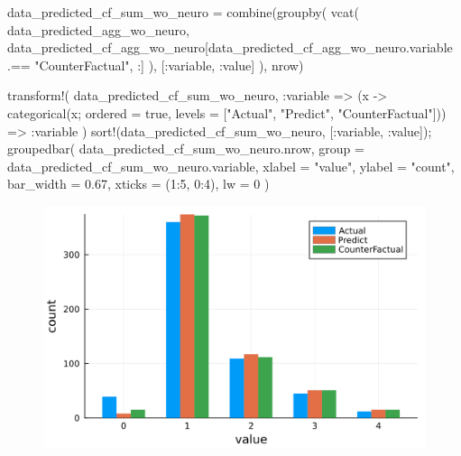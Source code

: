 \documentclass[
  letterpaper,
  DIV=11,
  numbers=noendperiod]{scrreprt}
\newenvironment{Shaded}{\begin{snugshade}}{\end{snugshade}}
\newcommand{\ConstantTok}[1]{\textcolor[rgb]{0.56,0.35,0.01}{#1}}
\newcommand{\FloatTok}[1]{\textcolor[rgb]{0.68,0.00,0.00}{#1}}
\newcommand{\FunctionTok}[1]{\textcolor[rgb]{0.28,0.35,0.67}{#1}}
\newcommand{\NormalTok}[1]{\textcolor[rgb]{0.00,0.23,0.31}{#1}}
\newcommand{\OperatorTok}[1]{\textcolor[rgb]{0.37,0.37,0.37}{#1}}
\newcommand{\StringTok}[1]{\textcolor[rgb]{0.13,0.47,0.30}{#1}}
\begin{document}
\begin{Shaded}
\begin{Highlighting}[]
\NormalTok{data\_predicted\_cf\_sum\_wo\_neuro }\OperatorTok{=} \FunctionTok{combine}\NormalTok{(}\FunctionTok{groupby}\NormalTok{(}
    \FunctionTok{vcat}\NormalTok{(}
\NormalTok{        data\_predicted\_agg\_wo\_neuro, }
\NormalTok{        data\_predicted\_cf\_agg\_wo\_neuro[data\_predicted\_cf\_agg\_wo\_neuro.variable }\OperatorTok{.==} \StringTok{"CounterFactual"}\NormalTok{, }\OperatorTok{:}\NormalTok{]}
\NormalTok{        ),}
\NormalTok{    [}\OperatorTok{:}\NormalTok{variable, }\OperatorTok{:}\NormalTok{value]}
\NormalTok{    ), nrow)}

\FunctionTok{transform!}\NormalTok{(}
\NormalTok{    data\_predicted\_cf\_sum\_wo\_neuro, }
    \OperatorTok{:}\NormalTok{variable }\OperatorTok{=\textgreater{}} 
\NormalTok{    (x }\OperatorTok{{-}\textgreater{}} \FunctionTok{categorical}\NormalTok{(x; ordered }\OperatorTok{=} \ConstantTok{true}\NormalTok{, levels }\OperatorTok{=}\NormalTok{ [}\StringTok{"Actual"}\NormalTok{, }\StringTok{"Predict"}\NormalTok{, }\StringTok{"CounterFactual"}\NormalTok{])) }\OperatorTok{=\textgreater{}} 
    \OperatorTok{:}\NormalTok{variable}
\NormalTok{    )}
\FunctionTok{sort!}\NormalTok{(data\_predicted\_cf\_sum\_wo\_neuro, [}\OperatorTok{:}\NormalTok{variable, }\OperatorTok{:}\NormalTok{value]);}
\FunctionTok{groupedbar}\NormalTok{(}
\NormalTok{    data\_predicted\_cf\_sum\_wo\_neuro.nrow, }
\NormalTok{    group }\OperatorTok{=}\NormalTok{ data\_predicted\_cf\_sum\_wo\_neuro.variable,}
\NormalTok{    xlabel }\OperatorTok{=} \StringTok{"value"}\NormalTok{, }
\NormalTok{    ylabel }\OperatorTok{=} \StringTok{"count"}\NormalTok{,}
\NormalTok{    bar\_width }\OperatorTok{=} \FloatTok{0.67}\NormalTok{,}
\NormalTok{    xticks }\OperatorTok{=}\NormalTok{ (}\FloatTok{1}\OperatorTok{:}\FloatTok{5}\NormalTok{, }\FloatTok{0}\OperatorTok{:}\FloatTok{4}\NormalTok{),}
\NormalTok{    lw }\OperatorTok{=} \FloatTok{0}
\NormalTok{)}
\end{Highlighting}
\end{Shaded}

\begin{figure}[H]

{\centering \includegraphics{./entry_exit_application_files/figure-pdf/cell-22-output-1.svg}

}

\end{figure}
\end{document}
